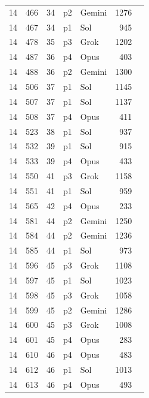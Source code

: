 \begin{longtable}{r r r l l r L{2.3in}}
14 & 466 & 34 & p2 & Gemini & 1276 &  \\
14 & 467 & 34 & p1 & Sol & 945 &  \\
14 & 478 & 35 & p3 & Grok & 1202 &  \\
14 & 487 & 36 & p4 & Opus & 403 &  \\
14 & 488 & 36 & p2 & Gemini & 1300 &  \\
14 & 506 & 37 & p1 & Sol & 1145 &  \\
14 & 507 & 37 & p1 & Sol & 1137 &  \\
14 & 508 & 37 & p4 & Opus & 411 &  \\
14 & 523 & 38 & p1 & Sol & 937 &  \\
14 & 532 & 39 & p1 & Sol & 915 &  \\
14 & 533 & 39 & p4 & Opus & 433 &  \\
14 & 550 & 41 & p3 & Grok & 1158 &  \\
14 & 551 & 41 & p1 & Sol & 959 &  \\
14 & 565 & 42 & p4 & Opus & 233 &  \\
14 & 581 & 44 & p2 & Gemini & 1250 &  \\
14 & 584 & 44 & p2 & Gemini & 1236 &  \\
14 & 585 & 44 & p1 & Sol & 973 &  \\
14 & 596 & 45 & p3 & Grok & 1108 &  \\
14 & 597 & 45 & p1 & Sol & 1023 &  \\
14 & 598 & 45 & p3 & Grok & 1058 &  \\
14 & 599 & 45 & p2 & Gemini & 1286 &  \\
14 & 600 & 45 & p3 & Grok & 1008 &  \\
14 & 601 & 45 & p4 & Opus & 283 &  \\
14 & 610 & 46 & p4 & Opus & 483 &  \\
14 & 612 & 46 & p1 & Sol & 1013 &  \\
14 & 613 & 46 & p4 & Opus & 493 &  \\

\end{longtable}
